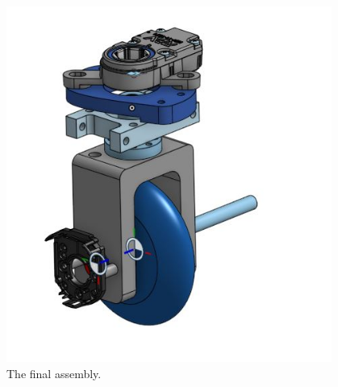 \begin{figure}[htp]
\centering
\includegraphics[width=0.95\textwidth, angle=0]{Meetings/October/10-20-21/10-20-21_CAD_Figure3 - Nathan Forrer.JPG}
\caption{The final assembly.}
\label{fig:102021_3}
\end{figure}


